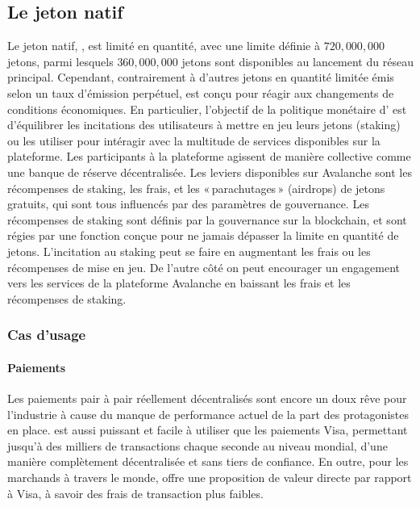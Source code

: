 \documentclass[runningheads,francais,a4paper]{llncs}
\begin{document}
\subsection{Le jeton natif \AVATokenName{}}
Le jeton natif, \AVATokenName{}, est limité en quantité, avec une limite définie à $720,000,000$ jetons, parmi lesquels
$360,000,000$ jetons sont disponibles au lancement du réseau principal. Cependant, contrairement à d'autres jetons en
quantité limitée émis selon un taux d'émission perpétuel, \AVATokenName{} est conçu pour réagir aux changements de
conditions économiques. En particulier, l'objectif de la politique monétaire d'\AVATokenName{} est d'équilibrer les
incitations des utilisateurs à mettre en jeu leurs jetons (staking) ou les utiliser pour intéragir avec la multitude de
services disponibles sur la plateforme. Les participants à la plateforme agissent de manière collective comme une banque
de réserve décentralisée. Les leviers disponibles sur Avalanche sont les récompenses de staking, les frais, et les
«\,parachutages\,» (airdrops) de jetons gratuits, qui sont tous influencés par des paramètres de gouvernance. Les
récompenses de staking sont définis par la gouvernance sur la blockchain, et sont régies par une fonction conçue pour
ne jamais dépasser la limite en quantité de jetons. L'incitation au staking peut se faire en augmentant les frais ou les
récompenses de mise en jeu. De l'autre côté on peut encourager un engagement vers les services de la plateforme
Avalanche en baissant les frais et les récompenses de staking.

\subsubsection{Cas d'usage}
\paragraph{Paiements}
Les paiements pair à pair réellement décentralisés sont encore un doux rêve pour l'industrie à cause du manque de
performance actuel de la part des protagonistes en place. \AVATokenName{} est aussi puissant et facile à utiliser que
les paiements Visa, permettant jusqu'à des milliers de transactions chaque seconde au niveau mondial, d'une manière
complètement décentralisée et sans tiers de confiance. En outre, pour les marchands à travers le monde, \AVATokenName{}
offre une proposition de valeur directe par rapport à Visa, à savoir des frais de transaction plus faibles.
\end{document}
